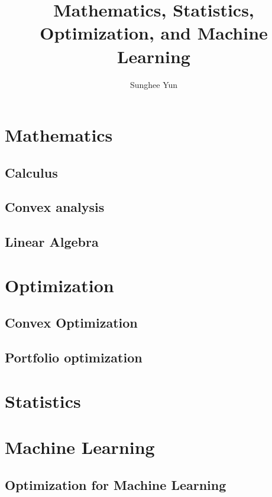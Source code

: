 \documentclass[10pt, twoside]{book}   	%
\title{Mathematics, Statistics, Optimization, and Machine Learning}
\author{Sunghee Yun}
\begin{document}
\maketitle

\setcounter{secnumdepth}{4}
\setcounter{tocdepth}{3}
\tableofcontents


\part{Mathematics}

\chapter{Calculus}


\chapter{Convex analysis}


\chapter{Linear Algebra}



\part{Optimization}

\chapter{Convex Optimization}


\chapter{Portfolio optimization}



\part{Statistics}



\part{Machine Learning}

\chapter{Optimization for Machine Learning}

\end{document}

